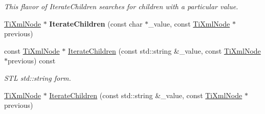 \begin{DoxyCompactItemize}
\begin{DoxyCompactList}\small\item\em This flavor of Iterate\+Children searches for children with a particular \textquotesingle{}value\textquotesingle{}. \end{DoxyCompactList}\item 
\hyperlink{class_ti_xml_node}{Ti\+Xml\+Node} $\ast$ {\bfseries Iterate\+Children} (const char $\ast$\+\_\+value, const \hyperlink{class_ti_xml_node}{Ti\+Xml\+Node} $\ast$previous)\hypertarget{class_ti_xml_node_a67ba8275e533e6f76340236c42ea0aea}{}\label{class_ti_xml_node_a67ba8275e533e6f76340236c42ea0aea}

\item 
const \hyperlink{class_ti_xml_node}{Ti\+Xml\+Node} $\ast$ \hyperlink{class_ti_xml_node_a1cbaaf8e82c09ad763d52616d75724df}{Iterate\+Children} (const std\+::string \&\+\_\+value, const \hyperlink{class_ti_xml_node}{Ti\+Xml\+Node} $\ast$previous) const \hypertarget{class_ti_xml_node_a1cbaaf8e82c09ad763d52616d75724df}{}\label{class_ti_xml_node_a1cbaaf8e82c09ad763d52616d75724df}

\begin{DoxyCompactList}\small\item\em S\+TL std\+::string form. \end{DoxyCompactList}\item 
\hyperlink{class_ti_xml_node}{Ti\+Xml\+Node} $\ast$ \hyperlink{class_ti_xml_node_a16e9ad53e2f5445b14bf325c90aa862c}{Iterate\+Children} (const std\+::string \&\+\_\+value, const \hyperlink{class_ti_xml_node}{Ti\+Xml\+Node} $\ast$previous)\hypertarget{class_ti_xml_node_a16e9ad53e2f5445b14bf325c90aa862c}{}\label{class_ti_xml_node_a16e9ad53e2f5445b14bf325c90aa862c}


\end{DoxyCompactItemize}
